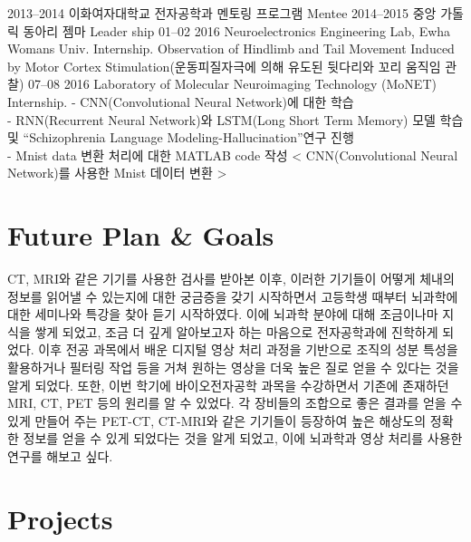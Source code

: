\documentclass[]{friggeri-cv}
\begin{document}
\begin{entrylist}
  \entry
    {2013–2014}
    {이화여자대학교 전자공학과 멘토링 프로그램}
    {Mentee}
    {}
  \entry
    {2014–2015}
    {중앙 가톨릭 동아리 젬마}
    {Leader ship}
    {}
  \entry
    {01–02 2016}
    {Neuroelectronics Engineering Lab, Ewha Womans Univ.}
    {Internship.}
    {Observation of Hindlimb and Tail Movement Induced by Motor Cortex Stimulation(운동피질자극에 의해 유도된 뒷다리와 꼬리 움직임 관찰)}
  \entry
    {07–08 2016}
    { Laboratory of Molecular Neuroimaging Technology (MoNET)}
    {Internship.}
    {- CNN(Convolutional Neural Network)에 대한 학습 \\
     - RNN(Recurrent Neural Network)와 LSTM(Long Short Term Memory) 모델 학습 및 “Schizophrenia Language Modeling-Hallucination”연구 진행 \\
     - Mnist data 변환 처리에 대한 MATLAB code 작성 < CNN(Convolutional Neural Network)를 사용한 Mnist 데이터 변환 > 
    }
\end{entrylist}
\section{Future Plan \& Goals}
\hspace{0.3cm} CT, MRI와 같은 기기를 사용한 검사를 받아본 이후, 이러한 기기들이 어떻게 체내의 정보를 읽어낼 수 있는지에 대한 궁금증을 갖기 시작하면서 고등학생 때부터 뇌과학에 대한 세미나와 특강을 찾아 듣기 시작하였다. 이에 뇌과학 분야에 대해 조금이나마 지식을 쌓게 되었고, 조금 더 깊게 알아보고자 하는 마음으로 전자공학과에 진학하게 되었다. 이후 전공 과목에서 배운 디지털 영상 처리 과정을 기반으로 조직의 성분 특성을 활용하거나 필터링 작업 등을 거쳐 원하는 영상을 더욱 높은 질로 얻을 수 있다는 것을 알게 되었다. 또한, 이번 학기에 바이오전자공학 과목을 수강하면서 기존에 존재하던 MRI, CT, PET 등의 원리를 알 수 있었다. 각 장비들의 조합으로 좋은 결과를 얻을 수 있게 만들어 주는 PET-CT, CT-MRI와 같은 기기들이 등장하여 높은 해상도의 정확한 정보를 얻을 수 있게 되었다는 것을 알게 되었고, 이에 뇌과학과 영상 처리를 사용한 연구를 해보고 싶다.
\pagebreak

\section{Projects}
\end{document}

